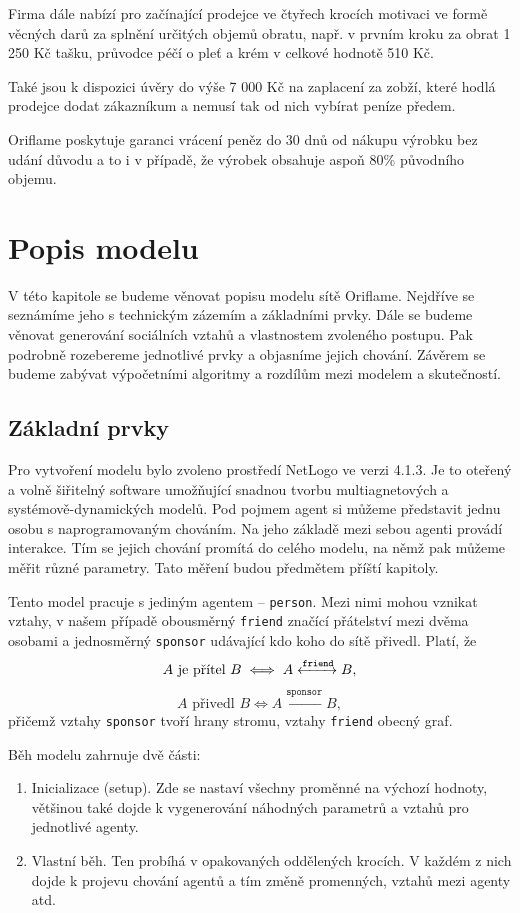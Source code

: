\documentclass[a4wide,12pt]{report}
\begin{document}
Firma dále nabízí pro začínající prodejce ve čtyřech krocích motivaci ve formě věcných darů za splnění určitých objemů obratu, např. v prvním kroku za obrat 1 250 Kč tašku, průvodce péčí o pleť a krém v celkové hodnotě 510 Kč.

Také jsou k dispozici úvěry do výše 7 000 Kč na zaplacení za zobží, které hodlá prodejce dodat zákazníkum a nemusí tak od nich vybírat peníze předem.

Oriflame poskytuje garanci vrácení peněz do 30 dnů od nákupu výrobku bez udání důvodu a to i v případě, že výrobek obsahuje aspoň 80\% původního objemu.



\chapter{Popis modelu}
V této kapitole se budeme věnovat popisu modelu sítě Oriflame. Nejdříve se seznámíme jeho s technickým zázemím a základními prvky. Dále se budeme věnovat generování sociálních vztahů a vlastnostem zvoleného postupu. Pak podrobně rozebereme jednotlivé prvky a objasníme jejich chování. Závěrem se budeme zabývat výpočetními algoritmy a rozdílům mezi modelem a skutečností.
\section{Základní prvky}
Pro vytvoření modelu bylo zvoleno prostředí NetLogo\cite{netlogo} ve verzi 4.1.3. Je to oteřený a volně šiřitelný software umožňující snadnou tvorbu multiagnetových a systémově-dynamických modelů. Pod pojmem agent si můžeme představit jednu osobu s naprogramovaným chováním. Na jeho základě mezi sebou agenti provádí interakce. Tím se jejich chování promítá do celého modelu, na němž pak můžeme měřit různé parametry. Tato měření budou předmětem příští kapitoly.

Tento model pracuje s jediným agentem -- \texttt{person}. Mezi nimi mohou vznikat vztahy, v našem případě obousměrný \texttt{friend} značící přátelství mezi dvěma osobami a jednosměrný \texttt{sponsor} udávající kdo koho do sítě přivedl. Platí, že
\[ A \text{ je přítel } B \iff A \xleftrightarrow{\texttt{friend}} B,\]
\[ A \text{ přivedl } B \iff A \xleftarrow{\texttt{sponsor}} B,\]
přičemž vztahy \texttt{sponsor} tvoří hrany stromu, vztahy \texttt{friend} obecný graf.

Běh modelu zahrnuje dvě části:
\begin{enumerate}
\item Inicializace (setup). Zde se nastaví všechny proměnné na výchozí hodnoty, většinou také dojde k vygenerování náhodných parametrů a vztahů pro jednotlivé agenty.
\item Vlastní běh. Ten probíhá v opakovaných oddělených krocích. V každém z nich dojde k projevu chování agentů a tím změně promenných, vztahů mezi agenty atd.
\end{enumerate}
\end{document}
